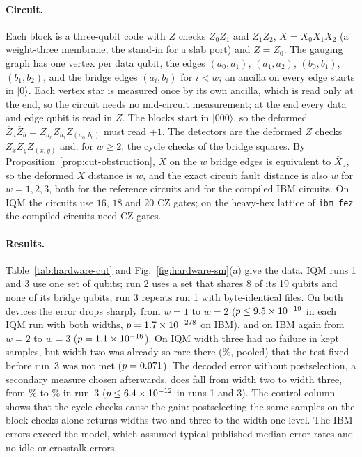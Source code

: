 \documentclass[aps,prx,reprint,superscriptaddress,nofootinbib,floatfix,longbibliography]{revtex4-2}
\theoremstyle{definition}
\begin{document}
\paragraph{Circuit.}
Each block is a three-qubit code with $Z$ checks $Z_0Z_1$ and $Z_1Z_2$,
$\overline X=X_0X_1X_2$ (a weight-three membrane, the stand-in for a slab
port) and $\overline Z=Z_0$.  The gauging graph has one vertex per data
qubit, the edges $(a_0,a_1)$, $(a_1,a_2)$, $(b_0,b_1)$, $(b_1,b_2)$, and the
bridge edges $(a_i,b_i)$ for $i<w$; an ancilla on every edge starts in
$|0\rangle$.  Each vertex star is measured once by its own ancilla, which is
read only at the end, so the circuit needs no mid-circuit measurement; at the
end every data and edge qubit is read in $Z$.  The blocks start in
$|000\rangle$, so the deformed $\overline Z_a\overline
Z_b=Z_{a_0}Z_{b_0}Z_{(a_0,b_0)}$ must read $+1$.  The detectors are the
deformed $Z$ checks $Z_xZ_yZ_{(x,y)}$ and, for $w\ge2$, the cycle checks of
the bridge squares.  By Proposition~\ref{prop:cut-obstruction}, $X$ on the
$w$ bridge edges is equivalent to $\overline X_a$, so the deformed $X$
distance is $w$, and the exact circuit fault distance is also $w$ for
$w=1,2,3$, both for the reference circuits and for the compiled IBM circuits.
On IQM the circuits use $16$, $18$ and $20$ CZ gates; on the heavy-hex
lattice of \texttt{ibm\_fez} the compiled circuits need \hwFezCZ{} CZ gates.

\paragraph{Results.}
Table~\ref{tab:hardware-cut} and Fig.~\ref{fig:hardware-sm}(a) give the data.
IQM runs 1 and 3 use one set of qubits; run 2 uses a set that shares 8 of its
19 qubits and none of its bridge qubits; run 3 repeats run 1 with
byte-identical files.  On both devices the error drops sharply from $w=1$ to
$w=2$ ($p\le9.5\times10^{-19}$ in each IQM run with both widths,
$p=1.7\times10^{-278}$ on IBM), and on
IBM again from $w=2$ to $w=3$ ($p=1.1\times10^{-16}$).  On IQM width three had
no failure in \hwIQMwThreeKept{} kept samples, but width two was already so
rare there (\hwIQMwTwo\%, pooled) that the test fixed before run~3 was not met
($p=0.071$).  The decoded error without postselection, a secondary
measure chosen afterwards, does fall from width two to width three, from
\hwDecTwo\% to \hwDecThree\% in run~3 ($p\le6.4\times10^{-12}$ in runs 1 and 3).  The
control column shows that the cycle checks cause the gain: postselecting the
same samples on the block checks alone returns widths two and three to the
width-one level.  The IBM errors exceed the model, which assumed typical
published median error rates and no idle or crosstalk errors.
\end{document}
